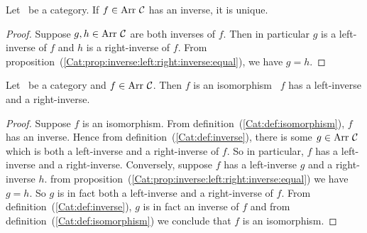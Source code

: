 \begin{prop}\label{Cat:prop:inverse:unique}
    Let \Cat\ be a category. If $f\in\mbox{\rm Arr}\ \mbox{$\cal C$}$ has 
    an inverse, it is unique.
\end{prop}
\begin{proof}
    Suppose $g,h\in\arr\ \Cat$ are both inverses of $f$. Then in particular
    $g$ is a left-inverse of $f$ and $h$ is a right-inverse of $f$. From
    proposition~(\ref{Cat:prop:inverse:left:right:inverse:equal}), we have $g=h$.
\end{proof}

\begin{prop}\label{Cat:prop:isomorphism:left:right}
    Let \Cat\ be a category and $f\in\mbox{\rm Arr}\ \mbox{$\cal C$}$. Then $f$ is an isomorphism
    \ifand\ $f$ has a left-inverse and a right-inverse.
\end{prop}
\begin{proof}
    Suppose $f$ is an isomorphism. From definition~(\ref{Cat:def:isomorphism}),
    $f$ has an inverse. Hence from definition~(\ref{Cat:def:inverse}), there
    is some $g\in\mbox{\rm Arr}\ \mbox{$\cal C$}$ which is both a left-inverse and a right-inverse
    of $f$. So in particular, $f$ has a left-inverse and a right-inverse.
    Conversely, suppose $f$ has a left-inverse $g$ and a right-inverse $h$.
    from proposition~(\ref{Cat:prop:inverse:left:right:inverse:equal}) we 
    have $g=h$. So $g$ is in fact both a left-inverse and a right-inverse 
    of $f$. From definition~(\ref{Cat:def:inverse}), $g$ is in fact an
    inverse of $f$ and from definition~(\ref{Cat:def:isomorphism}) we conclude
    that $f$ is an isomorphism.
\end{proof}
